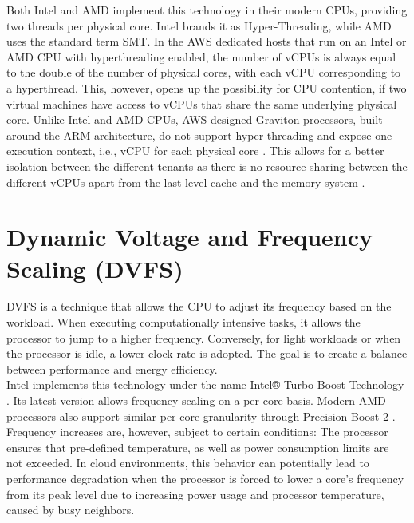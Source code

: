 \noindent
Both Intel and AMD implement this technology in their modern CPUs, providing two threads per physical core. 
Intel brands it as Hyper-Threading, while AMD uses the standard term \ac{SMT}. In the AWS dedicated hosts that run on an Intel or 
AMD CPU with hyperthreading enabled, the number of vCPUs is always equal to the double of the number of 
physical cores, with each vCPU corresponding to a hyperthread. This, however, opens up the possibility 
for CPU contention, if two virtual machines have access to vCPUs that share the same underlying physical core. 
Unlike Intel and AMD CPUs, AWS-designed Graviton processors, built around the ARM architecture, 
do not support hyper-threading and expose one execution context, i.e., vCPU for 
each physical core \cite{graviton}. This allows for a better isolation between the different tenants as 
there is no resource sharing between the different vCPUs apart from the last level cache and the memory 
system \cite{graviton}. 

\section{Dynamic Voltage and Frequency Scaling (DVFS)}
DVFS is a technique that allows the CPU to adjust its frequency based on the 
workload. When executing computationally intensive tasks, it allows the processor to jump to a 
higher frequency. Conversely, for light workloads or when the processor is idle, a lower clock rate 
is adopted. The goal is to create a balance between performance and energy efficiency. \\
Intel implements this technology under the name Intel® Turbo Boost Technology \cite{intelTurboBoost}. 
Its latest version allows frequency scaling on a per-core basis. Modern AMD processors also support 
similar per-core granularity through Precision Boost 2 \cite{amdPrecisionBoost2}. Frequency 
increases are, however, subject to certain conditions: The processor ensures that pre-defined temperature, 
as well as power consumption limits are not exceeded. In cloud environments, this behavior can potentially 
lead to performance degradation when the processor is forced to lower a core’s frequency from its peak 
level due to increasing power usage and processor temperature, caused by busy neighbors. 